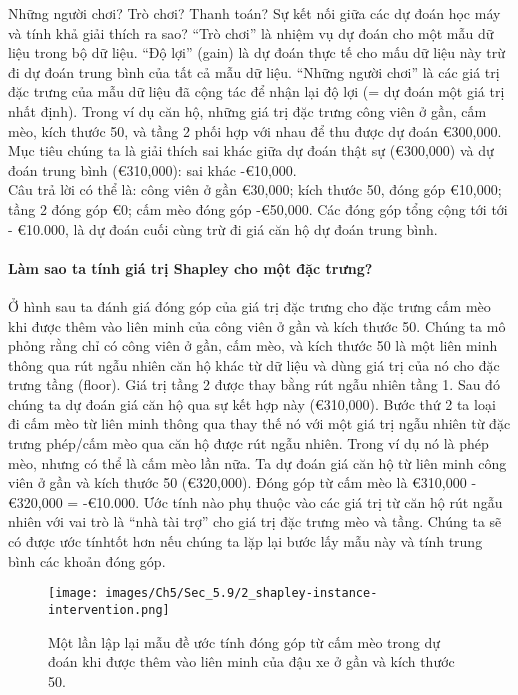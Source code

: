 Những người chơi? Trò chơi? Thanh toán? Sự kết nối giữa các dự đoán học máy và tính khả giải thích ra sao? “Trò chơi” là nhiệm vụ dự đoán cho một mẫu dữ liệu trong bộ dữ liệu. “Độ lợi” (gain) là dự đoán thực tế cho mấu dữ liệu này trừ đi dự đoán trung bình của tất cả mẫu dữ liệu. “Những người chơi” là các giá trị đặc trưng của mẫu dữ liệu đã cộng tác để nhận lại độ lợi (= dự đoán một giá trị nhất định). Trong ví dụ căn hộ, những giá trị đặc trưng công viên ở gần, cấm mèo, kích thước 50, và tầng 2 phối hợp với nhau để thu được dự đoán \euro 300,000. Mục tiêu chúng ta là giải thích sai khác giữa dự đoán thật sự (\euro 300,000) và dự đoán trung bình (\euro 310,000): sai khác -\euro10,000.\\
Câu trả lời có thể là: công viên ở gần \euro 30,000; kích thước 50, đóng góp \euro 10,000; tầng 2 đóng góp \euro 0; cấm mèo đóng góp -\euro50,000. Các đóng góp tổng cộng tới tới - \euro 10.000, là dự đoán cuối cùng trừ đi giá căn hộ dự đoán trung bình.

\paragraph{Làm sao ta tính giá trị Shapley cho một đặc trưng?}

Ở hình sau ta đánh giá đóng góp của giá trị đặc trưng cho đặc trưng cấm mèo khi được thêm vào liên minh của công viên ở gần và kích thước 50. Chúng ta mô phỏng rằng chỉ có công viên ở gần, cấm mèo, và kích thước 50 là một liên minh thông qua rút ngẫu nhiên căn hộ khác từ dữ liệu và dùng giá trị của nó cho đặc trưng tầng (floor). Giá trị tầng 2 được thay bằng rút ngẫu nhiên tầng 1. Sau đó chúng ta dự đoán giá căn hộ qua sự kết hợp này (\euro 310,000). Bước thứ 2 ta loại đi cấm mèo từ liên minh thông qua thay thế nó với một giá trị ngẫu nhiên từ đặc trưng phép/cấm mèo qua căn hộ được rút ngẫu nhiên. Trong ví dụ nó là phép mèo, nhưng có thể là cấm mèo lần nữa. Ta dự đoán giá căn hộ từ liên minh công viên ở gần và kích thước 50 (\euro 320,000). Đóng góp từ cấm mèo là \euro310,000 - \euro320,000 = -\euro10.000. Ước tính nào phụ thuộc vào các giá trị từ căn hộ rút ngẫu nhiên với vai trò là “nhà tài trợ” cho giá trị đặc trưng mèo và tầng. Chúng ta sẽ có được ước tínhtốt hơn nếu chúng ta lặp lại bước lấy mẫu này và tính trung bình các khoản đóng góp.
\begin{figure*}[h!]
	\centering
	\texttt{[image: images/Ch5/Sec\_5.9/2\_shapley-instance-intervention.png]}
	\label{fig:5_44}
	\caption{ Một lần lập lại mẫu đề ước tính đóng góp từ cấm mèo trong dự đoán khi được thêm vào liên minh của đậu xe ở gần và kích thước 50.}
\end{figure*}

